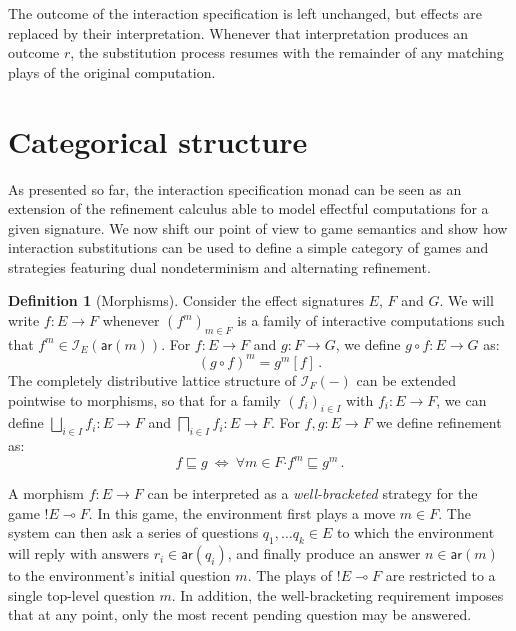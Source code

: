 \documentclass[draft,11pt]{report}
\theoremstyle{definition}
\newtheorem{definition}[theorem]{Definition}
\newcommand{\kw}[1]{\ensuremath{ \mathsf{#1} }}
\newcommand{\bdot}{\boldsymbol{\cdot}}
\begin{document}
The outcome of the interaction specification is left unchanged,
but effects are replaced by their interpretation.
Whenever that interpretation produces an outcome $r$,
the substitution process resumes with the remainder of any
matching plays of the original computation.


\section{Categorical structure} \label{sec:intm:cat} %

As presented so far,
the interaction specification monad
can be seen as an extension of the refinement calculus
able to model effectful computations
for a given signature.
We now shift our point of view to game semantics
and show how interaction substitutions
can be used to define a simple category of games and strategies
featuring dual nondeterminism and alternating refinement.

\begin{definition}[Morphisms]
Consider the effect signatures $E$, $F$ and $G$.
We will write $f : E \rightarrow F$
whenever $(f^m)_{m \in F}$ is a family of interactive computations
such that $f^m \in \mathcal{I}_E(\kw{ar}(m))$.
For $f : E \rightarrow F$ and $g : F \rightarrow G$,
we define $g \circ f : E \rightarrow G$ as:
\[ (g \circ f)^m = g^m[f] \,. \]
The completely distributive lattice structure
of $\mathcal{I}_F(-)$ can be extended pointwise
to morphisms,
so that for a family $(f_i)_{i \in I}$
with $f_i : E \rightarrow F$,
we can define
$\bigsqcup_{i \in I} f_i : E \rightarrow F$ and
$\bigsqcap_{i \in I} f_i : E \rightarrow F$.
For $f, g : E \rightarrow F$
we define refinement as:
\[
    f \sqsubseteq g \: \Leftrightarrow \:
    \forall m \in F \bdot f^m \sqsubseteq g^m \,.
\]
\end{definition}

A morphism $f : E \rightarrow F$
can be interpreted as a \emph{well-bracketed} strategy for the game
${!E} \multimap F$.
In this game,
the environment first plays a move $m \in F$.
The system can then ask a series of questions
$q_1, \ldots q_k \in E$
to which the environment will reply with
answers $r_i \in \kw{ar}(q_i)$,
and finally produce an answer $n \in \kw{ar}(m)$
to the environment's initial question $m$.
The plays of ${!E} \multimap F$
are restricted to a single top-level question $m$.
In addition, the well-bracketing requirement
imposes that at any point,
only the most recent pending question
may be answered.
\end{document}
